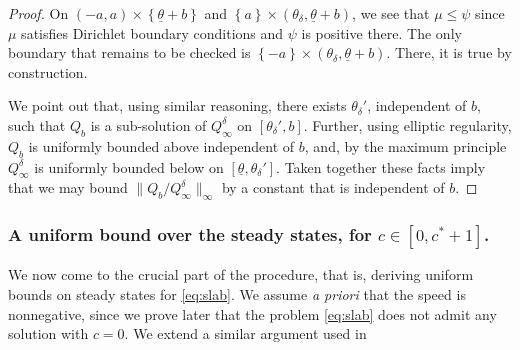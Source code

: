 \documentclass[11pt]{article}    %
\begin{document}
\begin{proof}
On $(-a,a) \times \left\lbrace \underline\theta + b \right\rbrace$ and $\left\lbrace a \right\rbrace \times (\theta_\delta,\underline\theta+b)$, we see that $\mu \leq \psi$ since $\mu$ satisfies Dirichlet boundary conditions and $\psi$ is positive there. The only boundary that remains to be checked is $\left\lbrace -a \right\rbrace \times (\theta_\delta,\underline\theta+b)$. There, it is true by construction.  %

We point out that, using similar reasoning, there exists $\theta_\delta'$, independent of $b$, such that $Q_b$ is a sub-solution of $Q_\infty^\delta$ on $[\theta_\delta',b]$. Further, using elliptic regularity, $Q_b$ is uniformly bounded above independent of $b$, and, by the maximum principle $Q_\infty^\delta$ is uniformly bounded below on $[\underline\theta, \theta_\delta']$.  Taken together these  facts imply that we may bound $\|Q_b/Q_\infty^\delta\|_\infty$ by a constant that is independent of $b$.


\end{proof}



\subsubsection*{A uniform bound over the steady states, for $c \in \left[ 0 , c^* + 1 \right]$.}

We now come to the crucial part of the procedure, that is, deriving uniform bounds on steady states for \eqref{eq:slab}.  We assume \textit{a priori} that the speed is nonnegative, since we prove later that the problem \eqref{eq:slab} does not admit any solution with $c=0$. We extend a similar argument used in \cite{BouinCalvez} %
\end{document}
